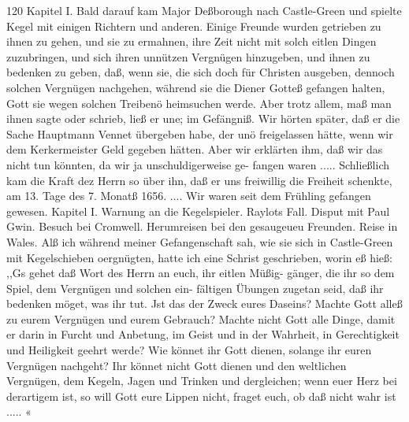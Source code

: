 120 Kapitel I.
Bald darauf kam Major Deßborough nach Castle-Green und
spielte Kegel mit einigen Richtern und anderen. Einige Freunde
wurden getrieben zu ihnen zu gehen, und sie zu ermahnen, ihre
Zeit nicht mit solch eitlen Dingen zuzubringen, und sich ihren
unnützen Vergnügen hinzugeben, und ihnen zu bedenken zu geben,
daß, wenn sie, die sich doch für Christen ausgeben, dennoch solchen
Vergnügen nachgehen, während sie die Diener Gotteß gefangen
halten, Gott sie wegen solchen Treibenö heimsuchen werde. Aber
trotz allem, maß man ihnen sagte oder schrieb, ließ er une; im
Gefängniß. Wir hörten später, daß er die Sache Hauptmann
Vennet übergeben habe, der unö freigelassen hätte, wenn wir
dem Kerkermeister Geld gegeben hätten. Aber wir erklärten ihm,
daß wir das nicht tun könnten, da wir ja unschuldigerweise ge-
fangen waren ..... Schließlich kam die Kraft dez Herrn so
über ihn, daß er uns freiwillig die Freiheit schenkte, am 13. Tage
des 7. Monatß 1656. .... Wir waren seit dem Frühling
gefangen gewesen.
Kapitel I.
Warnung an die Kegelspieler. Raylots Fall. Disput mit Paul
Gwin. Besuch bei Cromwell. Herumreisen bei den gesaugeueu
Freunden. Reise in Wales.
Alß ich während meiner Gefangenschaft sah, wie sie sich in
Castle-Green mit Kegelschieben oergnügten, hatte ich eine Schrist
geschrieben, worin eß hieß:
,,Gs gehet daß Wort des Herrn an euch, ihr eitlen Müßig-
gänger, die ihr so dem Spiel, dem Vergnügen und solchen ein-
fältigen Übungen zugetan seid, daß ihr bedenken möget, was ihr
tut. Jst das der Zweck eures Daseins? Machte Gott alleß zu
eurem Vergnügen und eurem Gebrauch? Machte nicht Gott alle
Dinge, damit er darin in Furcht und Anbetung, im Geist und in
der Wahrheit, in Gerechtigkeit und Heiligkeit geehrt werde? Wie
könnet ihr Gott dienen, solange ihr euren Vergnügen nachgeht?
Ihr könnet nicht Gott dienen und den weltlichen Vergnügen, dem
Kegeln, Jagen und Trinken und dergleichen; wenn euer Herz bei
derartigem ist, so will Gott eure Lippen nicht, fraget euch, ob daß
nicht wahr ist ..... «


